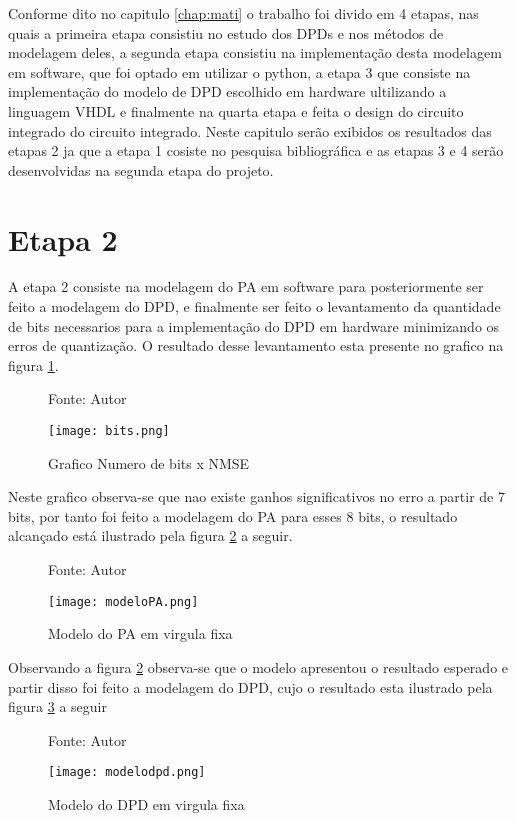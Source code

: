 Conforme dito no capitulo \ref{chap:mati} o trabalho foi divido em 4 etapas, nas quais a primeira etapa consistiu no estudo dos DPDs e nos métodos de modelagem deles, a segunda etapa consistiu na implementação desta modelagem em software, que foi optado em utilizar o python, a etapa 3 que consiste na implementação do modelo de DPD escolhido em hardware ultilizando a linguagem VHDL e finalmente na quarta etapa e feita o design do circuito integrado do circuito integrado.
Neste capitulo serão exibidos os resultados das etapas 2 ja que a etapa 1 cosiste no pesquisa bibliográfica e as etapas 3 e 4 serão desenvolvidas na segunda etapa do projeto.

\section{Etapa 2}
A etapa 2 consiste na modelagem do PA em software para posteriormente ser feito a modelagem do DPD, e finalmente ser feito o levantamento da quantidade de bits necessarios para a implementação do DPD em hardware minimizando os erros de quantização. 
O resultado desse levantamento esta presente no grafico na figura \ref{fig:bits}.
\begin{figure}[ht!]
    \centering
    \captionsetup{justification=centering}
    \caption*{Fonte: Autor}
    \texttt{[image: bits.png]}
    \caption{Grafico Numero de bits x NMSE}
    \label{fig:bits}
\end{figure}

Neste grafico observa-se que nao existe ganhos significativos no erro a partir de 7 bits, por tanto foi feito a modelagem do PA para esses 8 bits, o resultado alcançado está ilustrado pela figura \ref{fig:modelopa} a seguir.
\begin{figure}[ht!]
    \centering
    \captionsetup{justification=centering}
    \caption*{Fonte: Autor}
    \texttt{[image: modeloPA.png]}
    \caption{Modelo do PA em virgula fixa}
    \label{fig:modelopa}
\end{figure}

Observando a figura \ref{fig:modelopa} observa-se que o modelo apresentou o resultado esperado e partir disso foi feito a modelagem do DPD, cujo o resultado esta ilustrado pela figura \ref{fig:modelodpd} a seguir

\begin{figure}[ht!]
    \centering
    \captionsetup{justification=centering}
    \caption*{Fonte: Autor}
    \texttt{[image: modelodpd.png]}
    \caption{Modelo do DPD em virgula fixa}
    \label{fig:modelodpd}
\end{figure}